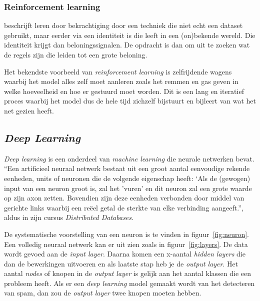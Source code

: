 \subsubsection{Reinforcement learning}
\textcite{Lievens2021} beschrijft leren door bekrachtiging door een techniek die niet echt een dataset gebruikt, maar eerder via een identiteit is die leeft in een (on)bekende wereld. Die identiteit krijgt dan beloningssignalen. De opdracht is dan om uit te zoeken wat de regels zijn die leiden tot een grote beloning.

Het bekendste voorbeeld van \textit{reinforcement learning} is zelfrijdende wagens waarbij het model alles zelf moet aanleren zoals het remmen en gas geven in welke hoeveelheid en hoe er gestuurd moet worden. Dit is een lang en iteratief proces waarbij het model dus de hele tijd zichzelf bijstuurt en bijleert van wat het net gezien heeft.

\subsection{\textit{Deep Learning}}
\textit{Deep learning} is een onderdeel van \textit{machine learning} die neurale netwerken bevat.
``Een artificieel neuraal netwerk bestaat uit een groot aantal eenvoudige rekende eenheden, units of neuronen die de volgende eigenschap heeft: `Als de (gewogen) input van een neuron groot is, zal het 'vuren' en dit neuron zal een grote waarde op zijn axon zetten. Bovendien zijn deze eenheden verbonden door middel van gerichte links waarbij een reëel getal de sterkte van elke verbinding aangeeft.'', aldus \textcite{Lievens2021} in zijn cursus \textit{Distributed Databases}.

De systematische voorstelling van een neuron is te vinden in figuur~\ref{fig:neuron}.
Een volledig neuraal netwerk kan er uit zien zoals in figuur~\ref{fig:layers}. De data wordt gevoed aan de \textit{input layer}. Daarna komen een x-aantal \textit{hidden layers} die dan de bewerkingen uitvoeren en als laatste stap heb je de \textit{output layer}. Het aantal \textit{nodes} of knopen in de \textit{output layer} is gelijk aan het aantal klassen die een probleem heeft. Als er een \textit{deep learning} model gemaakt wordt van het detecteren van spam, dan zou de \textit{output layer} twee knopen moeten hebben.


